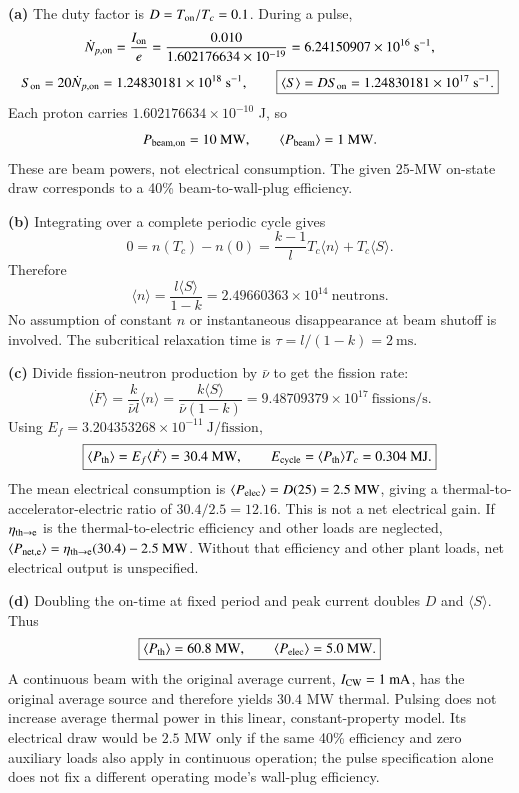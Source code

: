 \begin{draftsolution}
\textbf{(a)} The duty factor is $D=T_{\rm on}/T_c=0.1$. During a pulse,
\[
\dot N_{p,\rm on}=\frac{I_{\rm on}}{e}
=\frac{0.010}{1.602176634\times10^{-19}}
=6.24150907\times10^{16}~\mathrm{s^{-1}},
\]
\[
S_{\rm on}=20\dot N_{p,\rm on}=1.24830181\times10^{18}~\mathrm{s^{-1}},
\qquad \boxed{\langle S\rangle=DS_{\rm on}=1.24830181\times10^{17}~\mathrm{s^{-1}}.}
\]
Each proton carries $1.602176634\times10^{-10}$ J, so
\[
P_{\rm beam,on}=10~\mathrm{MW},\qquad
\langle P_{\rm beam}\rangle=1~\mathrm{MW}.
\]
These are beam powers, not electrical consumption. The given 25-MW on-state draw corresponds to a 40\% beam-to-wall-plug efficiency.

\textbf{(b)} Integrating over a complete periodic cycle gives
\[
0=n(T_c)-n(0)=\frac{k-1}{l}T_c\langle n\rangle+T_c\langle S\rangle.
\]
Therefore
\[
\boxed{\langle n\rangle=\frac{l\langle S\rangle}{1-k}
=2.49660363\times10^{14}~\text{neutrons}.}
\]
No assumption of constant $n$ or instantaneous disappearance at beam shutoff is involved. The subcritical relaxation time is $\tau=l/(1-k)=2~\mathrm{ms}$.

\textbf{(c)} Divide fission-neutron production by $\bar\nu$ to get the fission rate:
\[
\boxed{\langle\dot F\rangle=\frac{k}{\bar\nu l}\langle n\rangle
=\frac{k\langle S\rangle}{\bar\nu(1-k)}
=9.48709379\times10^{17}~\mathrm{fissions/s}.}
\]
Using $E_f=3.204353268\times10^{-11}~\mathrm{J/fission}$,
\[
\boxed{\langle P_{\rm th}\rangle=E_f\langle\dot F\rangle=30.4~\mathrm{MW},\qquad
E_{\rm cycle}=\langle P_{\rm th}\rangle T_c=0.304~\mathrm{MJ}.}
\]
The mean electrical consumption is $\langle P_{\rm elec}\rangle=D(25)=2.5~\mathrm{MW}$, giving a thermal-to-accelerator-electric ratio of $30.4/2.5=12.16$.
This is not a net electrical gain. If $\eta_{\rm th\to e}$ is the thermal-to-electric efficiency and other loads are neglected,
$\langle P_{\rm net,e}\rangle=\eta_{\rm th\to e}(30.4)-2.5~\mathrm{MW}$.
Without that efficiency and other plant loads, net electrical output is unspecified.

\textbf{(d)} Doubling the on-time at fixed period and peak current doubles $D$ and $\langle S\rangle$. Thus
\[
\boxed{\langle P_{\rm th}\rangle=60.8~\mathrm{MW},\qquad
\langle P_{\rm elec}\rangle=5.0~\mathrm{MW}.}
\]
A continuous beam with the original average current, $I_{\rm CW}=1~\mathrm{mA}$, has the original average source and therefore yields $30.4$ MW thermal. Pulsing does not increase average thermal power in this linear, constant-property model. Its electrical draw would be $2.5$ MW only if the same 40\% efficiency and zero auxiliary loads also apply in continuous operation; the pulse specification alone does not fix a different operating mode's wall-plug efficiency.


\end{draftsolution}
